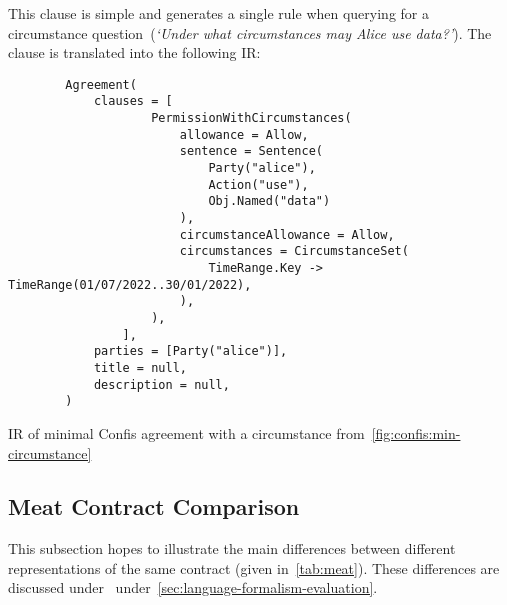 This clause is simple and generates a single rule when querying for a circumstance question~(\emph{`Under what circumstances may Alice use data?'}).
The clause is translated into the following IR:

\begin{code}
    \begin{verbatim}
        Agreement(
            clauses = [
                    PermissionWithCircumstances(
                        allowance = Allow,
                        sentence = Sentence(
                            Party("alice"),
                            Action("use"),
                            Obj.Named("data")
                        ),
                        circumstanceAllowance = Allow,
                        circumstances = CircumstanceSet(
                            TimeRange.Key -> TimeRange(01/07/2022..30/01/2022),
                        ),
                    ),
                ],
            parties = [Party("alice")],
            title = null,
            description = null,
        )
    \end{verbatim}
    \caption{IR of minimal Confis agreement with a circumstance from~\autoref{fig:confis:min-circumstance}}
    \label{fig:confis:min-circumstance-ir}
\end{code}


\subsection{Meat Contract Comparison}\label{subsec:meat-contract-comparison}

This subsection hopes to illustrate the main differences between different representations of the same contract (given in~\autoref{tab:meat}).
These differences are discussed under~ under~\autoref{sec:language-formalism-evaluation}.

